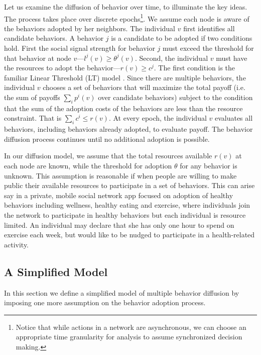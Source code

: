 \documentclass[letterpaper]{article}
\theoremstyle{plain} 		\newtheorem{thm}{Theorem}[section]
\theoremstyle{definition} 	\newtheorem{defn}[thm]{Definition}
\theoremstyle{remark}		\newtheorem{rem}{Remark}
\begin{document}
Let us examine the diffusion of behavior over time, to illuminate the key ideas. The process takes place over discrete epochs\footnote{Notice that while actions in a network are asynchronous, we can choose an appropriate time granularity for analysis to assume synchronized decision making.}. We assume each node is aware of the behaviors adopted by her neighbors. The individual $v$ first identifies all candidate behaviors. A behavior $j$ is a candidate to be adopted if two conditions hold. First the social signal strength for behavior $j$ must exceed the threshold for that behavior at node $v$---$l^j(v) \ge \theta^j(v)$. Second, the individual $v$ must have the resources to adopt the behavior---$r(v) \ge c^j$.  The first condition is the familiar Linear Threshold (LT) model \cite{Kempe03}. Since there are multiple behaviors, the individual $v$ chooses a set of behaviors that will maximize the total payoff (i.e. the sum of payoffs $\sum_i p^i(v)$ over candidate behaviors) subject to the condition that the sum of the adoption costs of the behaviors are less than the resource constraint. That is $\sum_i c^i \leq r(v)$. At every epoch, the individual $v$ evaluates all behaviors, including behaviors already adopted, to evaluate payoff. %
The behavior diffusion process continues until no additional adoption is possible. 

In our diffusion model, we assume that the total resources available $r(v)$ at each node  are known, while the threshold for adoption $\theta$ for any behavior is unknown. This assumption is reasonable if when people are willing to make public their available resources to participate in a set of behaviors. This can arise say in a private, mobile social network app focused on adoption of healthy behaviors including wellness, healthy eating and exercise, where individuals join the network to participate in healthy behaviors but each individual is resource limited. An individual may declare that she has only one hour to spend on exercise each week, but would like to be nudged to participate in a health-related activity.

\subsection{A Simplified Model}
In this section we define a simplified model of multiple behavior diffusion by imposing one more assumption on the behavior adoption process.
\end{document}
